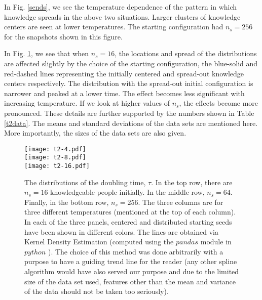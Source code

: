 \documentclass[a4paper,12pt]{article}
\begin{document}
In Fig. \ref{sends}, we see the temperature dependence of the
pattern in which knowledge spreads in the above
two situations.
Larger clusters of knowledge centers are seen at lower temperatures.
The starting configuration had $n_s=256$ for the snapshots shown in this figure.

In Fig. \ref{t2}, we see that when $n_s=16$, the locations and spread of the distributions
are affected slightly by the choice of the starting configuration, the blue-solid and 
red-dashed lines representing the initially centered and spread-out knowledge centers
respectively.
The distribution with the spread-out initial configuration is narrower and
peaked at a lower time.
The effect becomes less significant with increasing temperature.
If we look at higher values of $n_s$, the effects become more pronounced.
These details are further supported by the numbers shown in Table \ref{t2data}.
The means and standard deviations of the data sets are mentioned here.
More importantly, the sizes of the data sets are also given.
\begin{figure}
  \centering
  \texttt{[image: t2-4.pdf]}\\
  \texttt{[image: t2-8.pdf]}\\
  \texttt{[image: t2-16.pdf]}
  \caption{
    The distributions of the doubling time, $\tau$.
    In the top row, there are $n_s=16$ knowledgeable people initially.
    In the middle row, $n_s=64$. 
    Finally, in the bottom row, $n_s=256$.
    The three columns are for three different temperatures (mentioned at
    the top of each column).
    In each of the three panels, centered and distributed starting seeds have
    been shown in different colors. The lines are obtained via Kernel
    Density Estimation (computed using the $pandas$ module in $python$
    \cite{pandasKDE}).
    The choice of this method was done arbitrarily with a purpose to
    have a guiding trend line for the reader (any other spline algorithm
    would have also served our purpose and due to the limited size of the
    data set used,
    features other than the mean
    and variance of the data should not be taken too seriously). 
  }
  \label{t2}
\end{figure}
\end{document}
